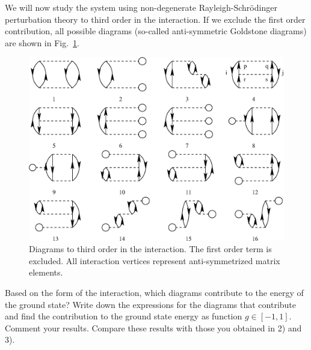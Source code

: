 \documentclass[prc]{revtex4} \usepackage[dvips]{graphicx}
\begin{document}
\begin{enumerate}
We will now study the system using non-degenerate
Rayleigh-Schr\"odinger perturbation theory to third order in the
interaction.  If we exclude the first order contribution, all possible
diagrams (so-called anti-symmetric Goldstone diagrams) are
shown in Fig.~\ref{fig:diagrams}.
\begin{figure}[hbtp]
\includegraphics[width=.6\textwidth]{figures/diagrams.eps}
\caption{Diagrams to third order in the interaction. The first order
  term is excluded. All interaction vertices represent anti-symmetrized matrix elements.\label{fig:diagrams}}
\end{figure}

Based on the form of the interaction, which diagrams contribute to the
energy of the ground state?  Write down the expressions for
the diagrams that contribute and find the contribution to the ground
state energy as function $g\in [-1,1]$. Comment your results.  Compare
these results with those you obtained in 2) and 3).



\end{enumerate}
\end{document}
